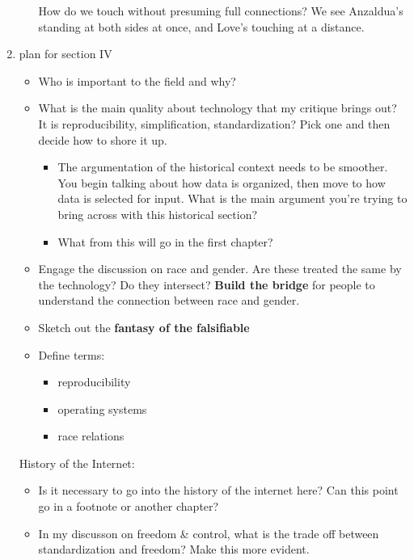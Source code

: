 \documentclass[11pt]{article}
\begin{document}
\begin{enumerate}
\begin{enumerate}
How do we touch without presuming full connections? We see Anzaldua's
standing at both sides at once, and Love's touching at a distance.
\end{enumerate}



\item plan for section IV
\label{sec:orgab343ad}

\begin{itemize}
\item Who is important to the field and why?

\item What is the main quality about technology that my critique brings
out? It is reproducibility, simplification, standardization? Pick
one and then decide how to shore it up. 
\begin{itemize}
\item The argumentation of the historical context needs to be
smoother. You begin talking about how data is organized, then
move to how data is selected for input. What is the main
argument you're trying to bring across with this historical
section?
\item What from this will go in the first chapter?
\end{itemize}
\item Engage the discussion on race and gender. Are these treated the
same by the technology? Do they intersect? \textbf{Build the bridge} for
people to understand the connection between race and gender.
\item Sketch out the \textbf{fantasy of the falsifiable}
\item Define terms:
\begin{itemize}
\item reproducibility
\item operating systems
\item race relations
\end{itemize}
\end{itemize}

History of the Internet:
\begin{itemize}
\item Is it necessary to go into the history of the internet here? Can
this point go in a footnote or another chapter?
\item In my discusson on freedom \& control, what is the trade off between
standardization and freedom? Make this more evident.
\end{itemize}


\end{enumerate}
\end{document}
